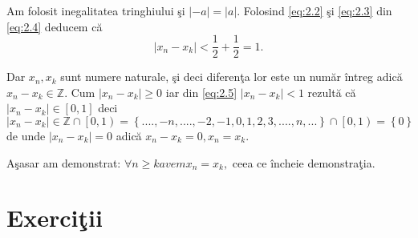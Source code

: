\documentclass[a4paper,12pt,oneside]{report}
\begin{document}
Am folosit inegalitatea tringhiului \c si \(\left | -a \right |= \left | a \right |\). Folosind \ref{eq:2.2} \c si \ref{eq:2.3} din \ref{eq:2.4} deducem c\u a 
\begin{displaymath}
  \left | x_{n}-x_{k} \right |< \frac{1}{2}+ \frac{1}{2}= 1. \label{eq:2.5} \tag{2.5} 
\end{displaymath}


Dar \(x_{n}, x_{k}\) sunt numere naturale, \c si deci diferen\c ta lor este un num\u ar \^ intreg adic\u a \(x_{n}- x_{k}\in \mathbb{Z}\). Cum \(\left |x_{n}- x_{k} \right |\geq 0\) iar din \ref{eq:2.5} \(\left |x_{n}- x_{k} \right |< 1\) rezult\u a c\u a \(\left |x_{n}- x_{k} \right |\in \left [ 0,1 \right ]\) deci \(\left |x_{n}- x_{k} \right |\in\mathbb{Z}\cap \left [ 0,1 \right)= \left \{ ....,-n ,....,-2,-1,0,1,2,3,....,n,... \right \}\cap \left [ 0,1 \right )= \left \{ 0 \right \}\) de unde \(\left | x_{n}-x_{k} \right |=0\) adic\u a \(x_{n}-x_{k}=0,x_{n}=x_{k}.\) 

A\c sasar am demonstrat: \(\forall n\geq k avem x_{n}=x_{k},\) ceea ce \^ incheie demonstra\c tia. 

\section{Exerci\c tii}
\end{document}
